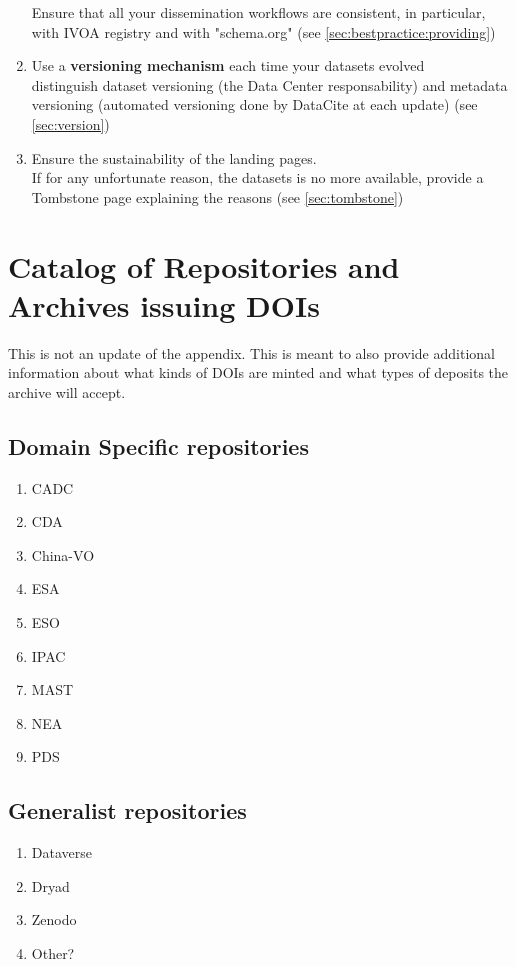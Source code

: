 \documentclass[11pt,a4paper]{ivoa}
\begin{document}
\begin{enumerate}
	Ensure that all your dissemination workflows are consistent, in particular, with IVOA registry and with "schema.org" (see \ref{sec:bestpractice:providing})
	\item Use a \textbf{versioning mechanism} each time your datasets evolved\\
	distinguish dataset versioning (the Data Center responsability) and metadata versioning (automated versioning done by DataCite at each update) (see \ref{sec:version})
	\item Ensure the sustainability of the landing pages.\\
	If for any unfortunate reason, the datasets is no more available, provide a Tombstone page explaining the reasons (see \ref{sec:tombstone})
\end{enumerate}


\appendix
\section{Catalog of Repositories and Archives issuing DOIs}
\label{sec:catalog}

This is not an update of the \citet{2022ApJS..260....5C} appendix. 
This is meant to also provide additional information about what kinds of DOIs are minted and what types of deposits the archive will accept.

\subsection{Domain Specific repositories}
\begin{enumerate}
	\item CADC
	\item CDA
	\item China-VO
	\item ESA
	\item ESO
	\item IPAC
	\item MAST
	\item NEA
	\item PDS
\end{enumerate}

\subsection{Generalist repositories}
\begin{enumerate}
	\item Dataverse
	\item Dryad
	\item Zenodo
	\item Other?
\end{enumerate}
\end{document}

